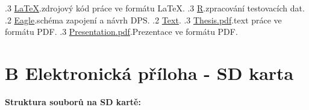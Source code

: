 {.3 \href{https://github.com/kovarmi9/BachelorThesis-Astrochronograph/tree/main/src/LaTeX}{LaTeX}.\dottedline zdrojový kód práce ve formátu \LaTeX.
.3 \href{https://github.com/kovarmi9/BachelorThesis-Astrochronograph/tree/main/src/R}{R}.\dottedline zpracování testovacích dat.
.2 \href{https://github.com/kovarmi9/BachelorThesis-Astrochronograph/tree/main/Eagle}{Eagle}.\dottedline schéma zapojení a návrh DPS.
.2 \href{https://github.com/kovarmi9/BachelorThesis-Astrochronograph/tree/main/Text}{Text}.
.3 \href{https://github.com/kovarmi9/BachelorThesis-Astrochronograph/blob/main/Text/Thesis.pdf}{Thesis.pdf}.\dottedline text práce ve formátu PDF.
.3 \href{https://github.com/kovarmi9/BachelorThesis-Astrochronograph/blob/main/Text/Presentation.pdf}{Presentation.pdf}.\dottedline Prezentace ve formátu PDF.
}

\newpage
\chapter*{B Elektronická příloha - SD karta}
\textbf{Struktura souborů na SD kartě:}
